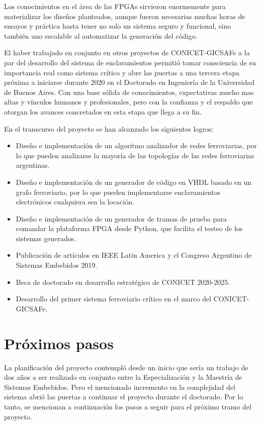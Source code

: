 	Los conocimientos en el área de las FPGAs sirvieron enormemente para materializar los diseños planteados, aunque fueron necesarias muchas horas de ensayos y práctica hasta tener no solo un sistema seguro y funcional, sino también uno escalable al automatizar la generación del código.
	
	El haber trabajado en conjunto en otros proyectos de CONICET-GICSAFe a la par del desarrollo del sistema de enclavamientos permitió tomar consciencia de su importancia real como sistema crítico y abre las puertas a una tercera etapa próxima a iniciarse durante 2020 en el Doctorado en Ingeniería de la Universidad de Buenos Aires. Con una base sólida de conocimientos, expectativas mucho mas altas y vínculos humanos y profesionales, pero con la confianza y el respaldo que otorgan los avances concretados en esta etapa que llega a su fin.

	En el transcurso del proyecto se han alcanzado los siguientes logros:
	
	\begin{itemize}
		\item Diseño e implementación de un algoritmo analizador de redes ferroviarias, por lo que pueden analizarse la mayoría de las topologías de las redes ferroviarias argentinas.
		\item Diseño e implementación de un generador de código en VHDL basado en un grafo ferroviario, por lo que pueden implementarse enclavamientos electrónicos cualquiera sea la locación.
		\item Diseño e implementación de un generador de tramas de prueba para comandar la plataforma FPGA desde Python, que facilita el testeo de los sistemas generados.
		\item Publicación de artículos en IEEE Latin America y el Congreso Argentino de Sistemas Embebidos 2019.
		\item Beca de doctorado en desarrollo estratégico de CONICET 2020-2025.
		\item Desarrollo del primer sistema ferroviario crítico en el marco del CONICET-GICSAFe.
	\end{itemize}
	
\section{Próximos pasos}

	La planificación del proyecto contempló desde un inicio que sería un trabajo de dos años a ser realizado en conjunto entre la Especialización y la Maestría de Sistemas Embebidos. Pero el mencionado incremento en la complejidad del sistema abrió las puertas a continuar el proyecto durante el doctorado. Por lo tanto, se mencionan a continuación los pasos a seguir para el próximo tramo del proyecto.	
	
